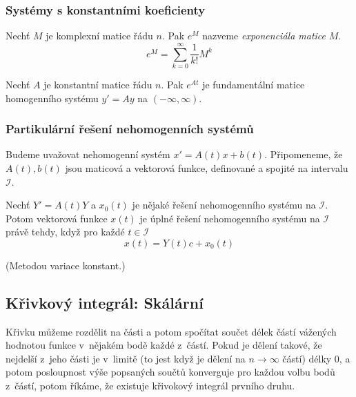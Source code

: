 \pagebreak

\subsubsection{Systémy s konstantními koeficienty}

\begin{definition}
    Nechť $M$ je komplexní matice řádu $n$. Pak $e^M$ nazveme
    {\em exponenciála matice} $M$.
\[
    e^M = \sum_{k = 0}^{\infty} \frac{1}{k!} M^k
\]
\end{definition}

\begin{theorem}
    Nechť $A$ je konstantní matice řádu $n$.
    Pak $e^{At}$ je fundamentální matice homogenního systému $y' = Ay$
    na $(-\infty, \infty)$.
\end{theorem}

\begin{example}
\end{example}

\subsubsection{Partikulární řešení nehomogenních systémů}

Budeme uvažovat nehomogenní systém $x' = A(t)x + b(t)$.
Připomeneme, že $A(t), b(t)$ jsou maticová a vektorová funkce,
definované a spojité na intervalu $\mathcal{I}$.

\begin{theorem}
    Nechť $Y' = A(t)Y$ a $x_0(t)$ je nějaké řešení nehomogenního systému
    na $\mathcal{I}$. Potom vektorová funkce $x(t)$ je úplné řešení
    nehomogenního systému na $\mathcal{I}$ právě tehdy,
    když pro každé $t \in \mathcal{I}$
    \[
        x(t) = Y(t)c + x_0(t)
    \]
\end{theorem}

\begin{example}
    (Metodou variace konstant.)
\end{example}

\subsection{Křivkový integrál: Skálární}


Křivku můžeme rozdělit na části a potom spočítat součet délek částí
vážených hodnotou funkce v~nějakém bodě každé z~částí. Pokud je
dělení takové, že nejdelší z~jeho části je v~limitě (to jest když je
dělení na $n\to \infty$ částí) délky 0, a potom posloupnost výše
popsaných součtů konverguje pro každou volbu bodů z~částí, potom říkáme,
že existuje křivokový integrál prvního druhu.


